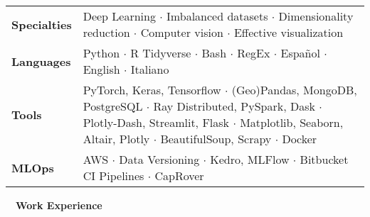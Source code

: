 \documentclass[a4paper,12pt]{article}
\newcommand{\resheading}[1]{{\hspace{-9pt} \colorbox{mygrey}{\begin{minipage}{\textwidth}{\textmd{~~\large \textbf{#1} \vphantom{p\^{E}}}}\end{minipage}}\vspace{6pt}} }
\begin{document}
    \vspace{-1em}
    \begin{tabularx}{\textwidth}{p{2.5cm}>{\arraybackslash}X}
        \bfseries{Specialties} & Deep Learning $\cdot$ Imbalanced datasets $\cdot$ Dimensionality reduction  $\cdot$ Computer vision $\cdot$  Effective visualization                                                                                                                \\
        \bfseries{Languages}   & Python $\cdot$ R Tidyverse $\cdot$ Bash $\cdot$  RegEx $\cdot$ Espa\~nol $\cdot$ English $\cdot$ Italiano                                                                                                                                         \\
        \bfseries{Tools}       & PyTorch, Keras, Tensorflow $\cdot$ (Geo)Pandas, \mbox{MongoDB}, PostgreSQL $\cdot$ Ray Distributed, PySpark, Dask $\cdot$ Plotly-Dash, Streamlit, Flask $\cdot$ Matplotlib, Seaborn, Altair, Plotly  $\cdot$ BeautifulSoup, Scrapy $\cdot$ Docker \\
        \bfseries{MLOps}       & AWS $\cdot$ Data Versioning $\cdot$ Kedro, MLFlow $\cdot$ Bitbucket CI Pipelines $\cdot$ CapRover                                                                                                                                                               \\
    \end{tabularx}


    \resheading{Work Experience}

% 
% 
\end{document}
